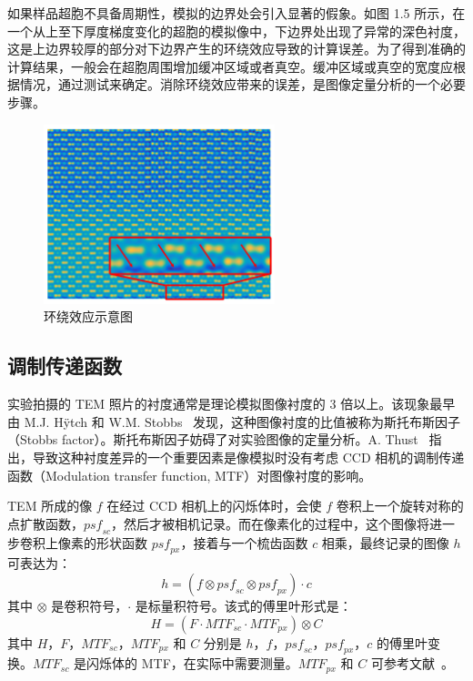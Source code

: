 如果样品超胞不具备周期性，模拟的边界处会引入显著的假象。如图 1.5 所示，在一个从上至下厚度梯度变化的超胞的模拟像中，下边界处出现了异常的深色衬度，这是上边界较厚的部分对下边界产生的环绕效应导致的计算误差。为了得到准确的计算结果，一般会在超胞周围增加缓冲区域或者真空。缓冲区域或真空的宽度应根据情况，通过测试来确定。消除环绕效应带来的误差，是图像定量分析的一个必要步骤。

\begin{figure}[htbp]
	\vspace{\baselineskip}
	\centering
	\includegraphics[width=0.6\textwidth]{../1.5/15}
	\caption{环绕效应示意图}\label{fig:15}
\end{figure}

\subsection{调制传递函数}

实验拍摄的 TEM 照片的衬度通常是理论模拟图像衬度的 3 倍以上。该现象最早由 M.J. Hÿtch 和 W.M. Stobbs~\cite{Hytch1994} 发现，这种图像衬度的比值被称为斯托布斯因子（Stobbs factor）。斯托布斯因子妨碍了对实验图像的定量分析。A. Thust~\cite{Thust2009} 指出，导致这种衬度差异的一个重要因素是像模拟时没有考虑 CCD 相机的调制传递函数（Modulation transfer function, MTF）对图像衬度的影响。

TEM 所成的像 $f$ 在经过 CCD 相机上的闪烁体时，会使 $f$ 卷积上一个旋转对称的点扩散函数，$\textit{psf}_{sc}$，然后才被相机记录。而在像素化的过程中，这个图像将进一步卷积上像素的形状函数 $\textit{psf}_{px}$，接着与一个梳齿函数 $c$ 相乘，最终记录的图像 $h$ 可表达为：
\begin{equation}
h=(f\otimes \textit{psf}_{sc} \otimes \textit{psf}_{px}) \cdot c
\end{equation}
其中 $\otimes$ 是卷积符号，$\cdot$ 是标量积符号。该式的傅里叶形式是：
\begin{equation}
H = (F \cdot \textit{MTF}_{sc}\cdot \textit{MTF}_{px})\otimes C
\end{equation}
其中 $H$，$F$，$\textit{MTF}_{sc}$，$\textit{MTF}_{px}$ 和 $C$ 分别是 $h$，$f$，$\textit{psf}_{sc}$，$\textit{psf}_{px}$，$c$ 的傅里叶变换。$\textit{MTF}_{sc}$ 是闪烁体的 MTF，在实际中需要测量。$\textit{MTF}_{px}$ 和 $C$ 可参考文献~\cite{VanBroek2012}。



